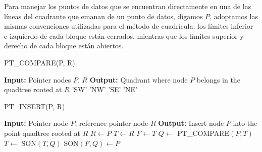 \documentclass[9pt,a4paper,twoside]{rho-class/rho}
\begin{document}
            Para manejar los puntos de datos que se encuentran directamente en una de las líneas del cuadrante que emanan de un punto de datos, digamos \(P\), adoptamos las mismas convenciones utilizadas para el método de cuadrícula; los límites inferior e izquierdo de cada bloque están cerrados, mientras que los límites superior y derecho de cada bloque están abiertos.
            \begin{algorithm}
                \caption{PT\_COMPARE(P, R)}
                \begin{algorithmic}[1]
                    \Statex \textbf{Input:} Pointer nodes $P$, $R$
                    \Statex \textbf{Output:} Quadrant where node $P$ belongs in the quadtree rooted at $R$
                    \State \Return 'SW'
                    \Else
                    \State \Return 'NW'
                    \EndIf
                    \Else
                    \State \Return 'SE'
                    \Else
                    \State \Return 'NE'
                    \EndIf
                    \EndIf
                \end{algorithmic}
            \end{algorithm}
            \begin{algorithm}
                \caption{PT\_INSERT(P, R)}
                \begin{algorithmic}[1]
                    \Statex \textbf{Input:} Pointer node $P$, reference pointer node $R$
                    \Statex \textbf{Output:} Insert node $P$ into the point quadtree rooted at $R$
                    \State $R \gets P$ 
                    \Else
                    \State $T \gets R$
                    \State $F \gets T$ 
                    \State $Q \gets$ PT\_COMPARE$(P, T)$
                    \State $T \gets$ SON$(T, Q)$
                    \EndWhile
                    \State SON$(F, Q) \gets P$ 
                    \EndIf
                    \EndIf
                \end{algorithmic}
            \end{algorithm}
            
            
\end{document}
